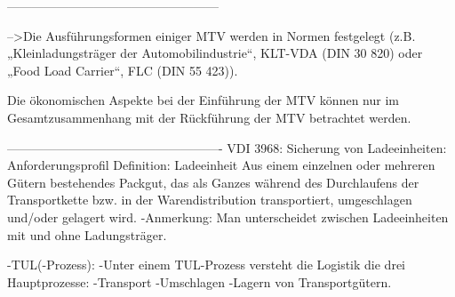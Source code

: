 ---------------------------------------------------        
        
    -->Die Ausführungsformen einiger MTV werden in Normen festgelegt (z.B. „Kleinladungsträger der Automobilindustrie“, KLT-VDA (DIN 30 820) oder „Food Load Carrier“, FLC (DIN 55 423)).
    
    Die ökonomischen Aspekte bei der Einführung der MTV können nur im Gesamtzusammenhang mit der Rückführung der MTV betrachtet werden.
    
----------------------------------------------------
VDI 3968: Sicherung von Ladeeinheiten: Anforderungsprofil
   Definition: Ladeeinheit
        Aus einem einzelnen oder mehreren Gütern bestehendes Packgut, das als Ganzes während des Durchlaufens der Transportkette bzw. in der Warendistribution transportiert, umgeschlagen und/oder gelagert wird. 
            -Anmerkung: Man unterscheidet zwischen Ladeeinheiten mit und ohne Ladungsträger.
            
    -TUL(-Prozess):
        -Unter einem TUL-Prozess versteht die Logistik die drei Hauptprozesse:
            -Transport
            -Umschlagen 
            -Lagern 
            von Transportgütern. 
        

